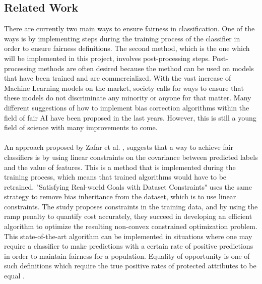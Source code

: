 \documentclass[11pt, fleqn, titlepage]{article}
\begin{document}
	\subsection{Related Work}
	There are currently two main ways to ensure fairness in classification. One of the ways is by implementing steps during the training process of the classifier in order to ensure fairness definitions. The second method, which is the one which will be implemented in this project, involves post-processing steps. Post-processing methods are often desired because the method can be used on models that have been trained and are commercialized. With the vast increase of Machine Learning models on the market, society calls for ways to ensure that these models do not discriminate any minority or anyone for that matter. Many different suggestions of how to implement bias correction algorithms within the field of fair AI have been proposed in the last years. However, this is still a young field of science with many improvements to come.\\\\
	\noindent
	An approach proposed by Zafar et al. \cite{Zafar}, suggests that a way to achieve fair classifiers is by using linear constraints on the covariance between predicted labels and the value of features. This is a method that is implemented during the training process, which means that trained algorithms would have to be retrained. "Satisfying Real-world Goals with Dataset Constraints" uses the same strategy to remove bias inheritance from the dataset, which is to use linear constraints. The study proposes constraints in the training data, and by using the ramp penalty to quantify cost accurately, they succeed in developing an efficient algorithm to optimize the resulting non-convex constrained optimization problem. This state-of-the-art algorithm can be implemented in situations where one may require a classifier to make predictions with a certain rate of positive predictions in order to maintain fairness for a population. Equality of opportunity is one of such definitions which require the true positive rates of protected attributes to be equal \cite{g_goh}. \\
	
\end{document}
